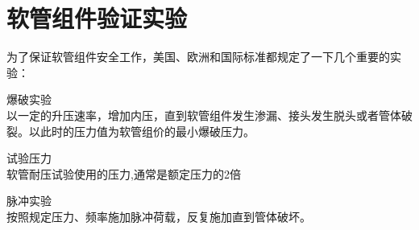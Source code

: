 \section{软管组件验证实验}
为了保证软管组件安全工作，美国、欧洲和国际标准都规定了一下几个重要的实验：
\begin{compactenum}
	\item 爆破实验\\
	以一定的升压速率，增加内压，直到软管组件发生渗漏、接头发生脱头或者管体破裂。以此时的压力值为软管组价的最小爆破压力。
	
	\begin{figure}[!htbp]
		\centering
		\label{fig:placeholder}
	\end{figure}
	
	\item 试验压力\\
	软管耐压试验使用的压力,通常是额定压力的2倍
	\item 脉冲实验\\
	按照规定压力、频率施加脉冲荷载，反复施加直到管体破坏。
\end{compactenum}	



